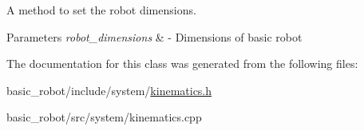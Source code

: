 A method to set the robot dimensions. 


\begin{DoxyParams}{Parameters}
{\em robot\+\_\+dimensions} & -\/ Dimensions of basic robot \\
\hline
\end{DoxyParams}


The documentation for this class was generated from the following files\+:\begin{DoxyCompactItemize}
\item 
basic\+\_\+robot/include/system/\hyperlink{kinematics_8h}{kinematics.\+h}\item 
basic\+\_\+robot/src/system/kinematics.\+cpp\end{DoxyCompactItemize}
